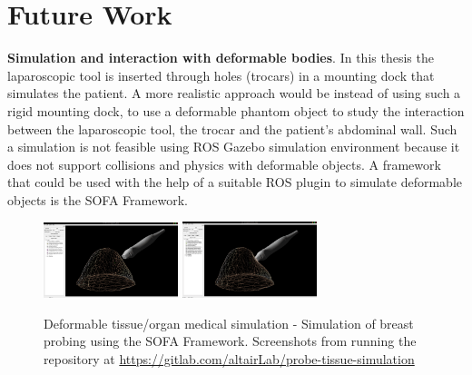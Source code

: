 \section{Future Work}
%
\textbf{Simulation and interaction with deformable bodies}. 
In this thesis the laparoscopic tool is inserted through holes (trocars) in a mounting dock that simulates the patient. A more realistic approach would be instead of using such a rigid mounting dock, to use a deformable phantom object to study the interaction between the laparoscopic tool, the trocar and the patient's abdominal wall. Such a simulation is not feasible using ROS Gazebo simulation environment because it does not support collisions and physics with deformable objects. A framework that could be used with the help of a suitable ROS plugin to simulate deformable objects is the SOFA Framework.
%
\begin{center}
\begin{figure}[!htb]
\centering
\includegraphics[width=0.35\textwidth]{images/future-work-sofa1.png}
\includegraphics[width=0.35\textwidth]{images/future-work-sofa2.png}\\
\caption{Deformable tissue/organ medical simulation - Simulation of breast probing using the SOFA Framework. Screenshots from running the repository at
\url{https://gitlab.com/altairLab/probe-tissue-simulation}}
\end{figure}
\end{center}

